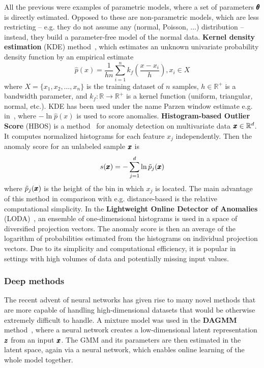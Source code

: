 All the previous were examples of parametric models, where a set of parameters $\pmb{{\theta}}$ is directly estimated. Opposed to these are non-parametric models, which are less restricting  -- e.g. they do not assume any (normal, Poisson, ...) distribution -- instead, they build a parameter-free model of the normal data. \textbf{Kernel density estimation} (KDE) method~\cite{parzen1962estimation}, which estimates an unknown univariate probability density function by an empirical estimate
\begin{equation} \label{eq:kde}
	\hat{p}(x) = \frac{1}{hn} \sum_{i=1}^n k_f \left( \frac{x-x_i}{h} \right), x_i \in X
\end{equation}
where $X = \lbrace x_1, x_2, \ldots, x_n \rbrace$ is the training dataset of $n$ samples, $h \in \mathbb{R}^+$ is a bandwidth parameter, and $k_f:\mathbb{R} \rightarrow \mathbb{R}^+$ is a kernel function (uniform, triangular, normal, etc.). KDE has been used under the name Parzen window estimate e.g. in~\cite{tarassenko1995novelty,yeung2002parzen}, where $-\ln \hat{p}(x)$ is used to score anomalies. \textbf{Histogram-based Outlier Score} (HBOS) is a method~\cite{goldstein2012histogram} for anomaly detection on multivariate data $\pmb{{x}} \in \mathbb{R}^d$. It computes normalized histograms for each feature $x_j$ independently. Then the anomaly score for an unlabeled sample $\pmb{{x}}$ is
\begin{equation} \label{eq:hbos}
	s(\pmb{{x}}) =  -\sum_{j=1}^d \ln \tilde{p}_j(\pmb{{x}})
\end{equation}
where $\tilde{p}_j(\pmb{{x}})$ is the height of the bin in which $x_j$ is located. The main advantage of this method in comparison with e.g. distance-based is the relative computational simplicity. In the \textbf{Lightweight Online Detector of Anomalies} (LODA)~\cite{pevny2016loda}, an ensemble of one-dimensional histograms is used in a space of diversified projection vectors. The anomaly score is then an average of the logarithm of probabilities estimated from the histograms on individual projection vectors. Due to its simplicity and computational efficiency, it is popular in settings with high volumes of data and potentially missing input values.

\subsubsection{Deep methods}
The recent advent of neural networks has given rise to many novel methods that are more capable of handling high-dimensional datasets that would be otherwise extremely difficult to handle. A mixture model was used in the \textbf{DAGMM} method~\cite{zong2018deep}, where a neural network creates a low-dimensional latent representation $\pmb{{z}}$ from an input $\pmb{{x}}$. The GMM and its parameters are then estimated in the latent space, again via a neural network, which enables online learning of the whole model together.

